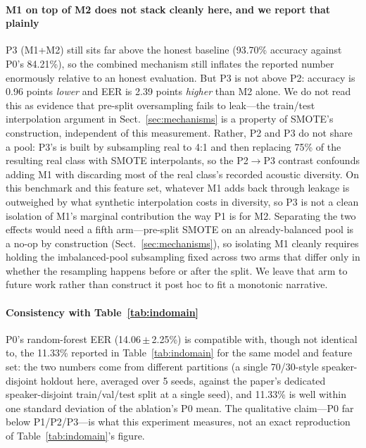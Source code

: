 \documentclass[sn-mathphys-num,pdflatex]{sn-jnl}
\begin{document}
\paragraph{M1 on top of M2 does not stack cleanly here, and we report that
plainly}
P3 (M1+M2) still sits far above the honest baseline (93.70\% accuracy against
P0's 84.21\%), so the combined mechanism still inflates the reported number
enormously relative to an honest evaluation. But P3 is not above P2: accuracy is
0.96 points \emph{lower} and EER is 2.39 points \emph{higher} than M2 alone. We
do not read this as evidence that pre-split oversampling fails to leak---the
train/test interpolation argument in Sect.~\ref{sec:mechanisms} is a property of
SMOTE's construction, independent of this measurement. Rather, P2 and P3 do not
share a pool: P3's is built by subsampling real to 4:1 and then replacing 75\%
of the resulting real class with SMOTE interpolants, so the P2$\to$P3 contrast
confounds adding M1 with discarding most of the real class's recorded acoustic
diversity. On this benchmark and this feature set, whatever M1 adds back through
leakage is outweighed by what synthetic interpolation costs in diversity, so P3
is not a clean isolation of M1's marginal contribution the way P1 is for M2.
Separating the two effects would need a fifth arm---pre-split SMOTE on an
already-balanced pool is a no-op by construction (Sect.~\ref{sec:mechanisms}),
so isolating M1 cleanly requires holding the imbalanced-pool subsampling fixed
across two arms that differ only in whether the resampling happens before or
after the split. We leave that arm to future work rather than construct it
post hoc to fit a monotonic narrative.

\paragraph{Consistency with Table~\ref{tab:indomain}}
P0's random-forest EER (14.06\,$\pm$\,2.25\%) is compatible with, though not
identical to, the 11.33\% reported in Table~\ref{tab:indomain} for the same
model and feature set: the two numbers come from different partitions (a single
70/30-style speaker-disjoint holdout here, averaged over 5 seeds, against the
paper's dedicated speaker-disjoint train/val/test split at a single seed), and
11.33\% is well within one standard deviation of the ablation's P0 mean. The
qualitative claim---P0 far below P1/P2/P3---is what this experiment measures,
not an exact reproduction of Table~\ref{tab:indomain}'s figure.
\end{document}
